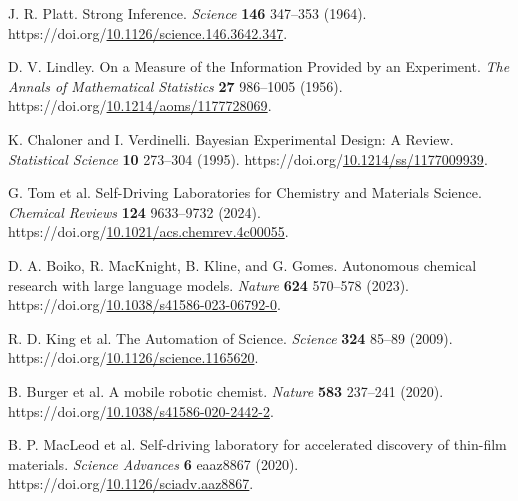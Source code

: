 \documentclass[12pt,a4paper]{article}
\newlength{\csllabelwidth}\setlength{\csllabelwidth}{2em}
\newenvironment{CSLReferences}[2]{\small\setlength{\parindent}{0pt}\setlength{\parskip}{4pt}}{\par}
\newcommand{\CSLLeftMargin}[1]{\par\noindent\makebox[\csllabelwidth][l]{#1}}
\newcommand{\CSLRightInline}[1]{\parbox[t]{\dimexpr\linewidth-\csllabelwidth\relax}{#1}\par}
\begin{document}
\protect{}\label{refs}
\begin{CSLReferences}{0}{1}
\hypertarget{ref-platt1964inference}{}
\CSLLeftMargin{1. }%
\CSLRightInline{J. R. Platt. {Strong Inference}. \emph{Science} \textbf{146} 347--353 (1964). https://doi.org/\href{https://doi.org/10.1126/science.146.3642.347}{10.1126/science.146.3642.347}.}

\hypertarget{ref-lindley1956information}{}
\CSLLeftMargin{2. }%
\CSLRightInline{D. V. Lindley. {On a Measure of the Information Provided by an Experiment}. \emph{The Annals of Mathematical Statistics} \textbf{27} 986--1005 (1956). https://doi.org/\href{https://doi.org/10.1214/aoms/1177728069}{10.1214/aoms/1177728069}.}

\hypertarget{ref-chaloner1995design}{}
\CSLLeftMargin{3. }%
\CSLRightInline{K. Chaloner and I. Verdinelli. {Bayesian Experimental Design: A Review}. \emph{Statistical Science} \textbf{10} 273--304 (1995). https://doi.org/\href{https://doi.org/10.1214/ss/1177009939}{10.1214/ss/1177009939}.}

\hypertarget{ref-tom2024selfdriving}{}
\CSLLeftMargin{4. }%
\CSLRightInline{G. Tom et al. {Self-Driving Laboratories for Chemistry and Materials Science}. \emph{Chemical Reviews} \textbf{124} 9633--9732 (2024). https://doi.org/\href{https://doi.org/10.1021/acs.chemrev.4c00055}{10.1021/acs.chemrev.4c00055}.}

\hypertarget{ref-boiko2023autonomous}{}
\CSLLeftMargin{5. }%
\CSLRightInline{D. A. Boiko, R. MacKnight, B. Kline, and G. Gomes. Autonomous chemical research with large language models. \emph{Nature} \textbf{624} 570--578 (2023). https://doi.org/\href{https://doi.org/10.1038/s41586-023-06792-0}{10.1038/s41586-023-06792-0}.}

\hypertarget{ref-king2009automation}{}
\CSLLeftMargin{6. }%
\CSLRightInline{R. D. King et al. {The Automation of Science}. \emph{Science} \textbf{324} 85--89 (2009). https://doi.org/\href{https://doi.org/10.1126/science.1165620}{10.1126/science.1165620}.}

\hypertarget{ref-burger2020mobile}{}
\CSLLeftMargin{7. }%
\CSLRightInline{B. Burger et al. {A mobile robotic chemist}. \emph{Nature} \textbf{583} 237--241 (2020). https://doi.org/\href{https://doi.org/10.1038/s41586-020-2442-2}{10.1038/s41586-020-2442-2}.}

\hypertarget{ref-macleod2020selfdriving}{}
\CSLLeftMargin{8. }%
\CSLRightInline{B. P. MacLeod et al. {Self-driving laboratory for accelerated discovery of thin-film materials}. \emph{Science Advances} \textbf{6} eaaz8867 (2020). https://doi.org/\href{https://doi.org/10.1126/sciadv.aaz8867}{10.1126/sciadv.aaz8867}.}


\end{CSLReferences}
\end{document}
